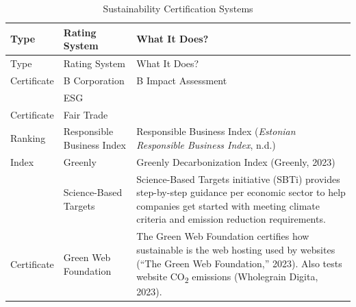 \documentclass[
  12pt,
  letterpaper,
  DIV=11,
  numbers=noendperiod]{scrartcl}
\begin{document}
\def\pandoctableshortcapt{Sustainability Certification Systems}

\begin{longtable}[]{@{}
  >{\raggedright\arraybackslash}p{}
  >{\raggedright\arraybackslash}p{}
  >{\raggedright\arraybackslash}p{}@{}}
\caption[Sustainability Certification Systems]{Sustainability
Certification Systems}\tabularnewline
\toprule\noalign{}
\begin{minipage}[b]{\linewidth}\raggedright
Type
\end{minipage} & \begin{minipage}[b]{\linewidth}\raggedright
Rating System
\end{minipage} & \begin{minipage}[b]{\linewidth}\raggedright
What It Does?
\end{minipage} \\
\midrule\noalign{}
\endfirsthead
\toprule\noalign{}
\begin{minipage}[b]{\linewidth}\raggedright
Type
\end{minipage} & \begin{minipage}[b]{\linewidth}\raggedright
Rating System
\end{minipage} & \begin{minipage}[b]{\linewidth}\raggedright
What It Does?
\end{minipage} \\
\midrule\noalign{}
\endhead
\bottomrule\noalign{}
\endlastfoot
Certificate & B Corporation & B Impact Assessment \\
& ESG & \\
Certificate & Fair Trade & \\
Ranking & Responsible Business Index & Responsible Business Index
(\emph{Estonian {Responsible Business Index}}, n.d.) \\
Index & Greenly & Greenly Decarbonization Index (Greenly, 2023) \\
& Science-Based Targets & Science-Based Targets initiative (SBTi)
provides step-by-step guidance per economic sector to help companies get
started with meeting climate criteria and emission reduction
requirements. \\
Certificate & Green Web Foundation & The Green Web Foundation certifies
how sustainable is the web hosting used by websites ({``The {Green Web
Foundation},''} 2023). Also tests website CO\textsubscript{2} emissions
(Wholegrain Digita, 2023). \\

\end{longtable}
\end{document}
